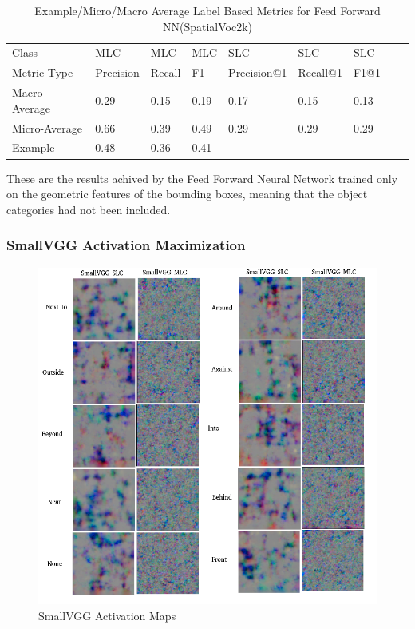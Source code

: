 \documentclass{csfyp}
\begin{document}
\begin{table}[!htbp]
\begin{tabular}{|l|l|l|l|l|l|l|l|l}
Class &  MLC  &  MLC  &  MLC & SLC &  SLC & SLC \\ \cline{1-7}
Metric Type  & Precision &  Recall & F1 & Precision@1 & Recall@1 & F1@1 \\ \cline{1-7}
Macro-Average &	0.29	&	0.15	&	0.19	&	0.17	&	0.15	&	0.13\\ \cline{1-7}
Micro-Average &	0.66	&	0.39	&	0.49	&	0.29	&	0.29	&	0.29 \\ \cline{1-7}
Example       &	0.48	&	0.36	&	0.41 \\ \cline{1-4}
\end{tabular}
\caption{Example/Micro/Macro Average Label Based Metrics for Feed Forward NN(SpatialVoc2k)}
These are the results achived by the Feed Forward Neural Network trained only on the geometric features of the bounding boxes, meaning that the object categories had not been included.
\vspace{-4mm}
\end{table}

\subsubsection{SmallVGG Activation Maximization}
\begin{figure}[!htbp]
	\includegraphics[scale=0.60,center]{Small_Spatial.pdf}
	\caption{SmallVGG Activation Maps}
\end{figure}
\end{document}
